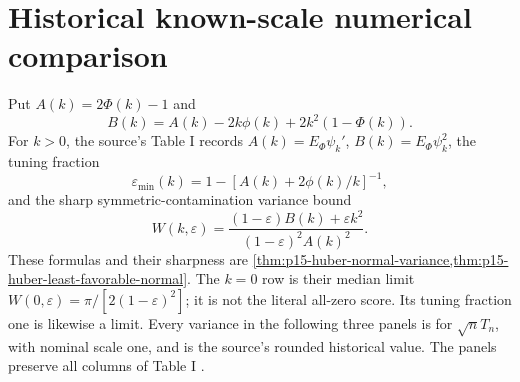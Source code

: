 \section{Historical known-scale numerical comparison}
\label{sec:p15-huber-table-one}

Put \(A(k)=2\Phi(k)-1\) and
\[
 B(k)=A(k)-2k\phi(k)+2k^2(1-\Phi(k)).
\]
For \(k>0\), the source's Table I records \(A(k)=E_\Phi\psi_k'\),
\(B(k)=E_\Phi\psi_k^2\), the tuning fraction
\[
 \varepsilon_{\min}(k)=1-
       [A(k)+2\phi(k)/k]^{-1},
\]
and the sharp symmetric-contamination variance bound
\[
 W(k,\varepsilon)
 =\frac{(1-\varepsilon)B(k)+\varepsilon k^2}
        {(1-\varepsilon)^2A(k)^2}.
\]
These formulas and their sharpness are
\cref{thm:p15-huber-normal-variance,thm:p15-huber-least-favorable-normal}.
The \(k=0\) row is their median limit
\(W(0,\varepsilon)=\pi/[2(1-\varepsilon)^2]\); it is not the
literal all-zero score. Its tuning fraction one is likewise a limit.
Every variance in the following three panels is for \(\sqrt nT_n\),
with nominal scale one, and is the source's rounded historical value.
The panels preserve all columns of Table I \cite[pp.~84--85]{Huber1964RobustLocation}.

